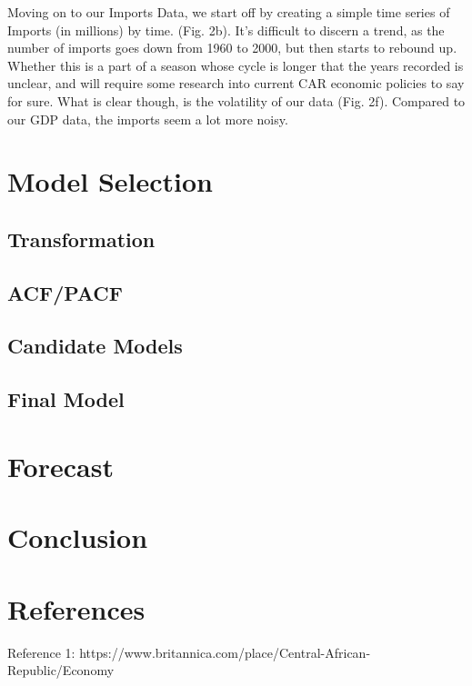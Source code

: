 \documentclass[11pt]{article}
\begin{document}
Moving on to our Imports Data, we start off by creating a simple time series of Imports (in millions) by time. (Fig. 2b). It's difficult to discern a trend, as the number of imports goes down from 1960 to 2000, but then starts to rebound up. Whether this is a part of a season whose cycle is longer that the years recorded is unclear, and will require some research into current CAR economic policies to say for sure. What is clear though, is the volatility of our data (Fig. 2f). Compared to our GDP data, the imports seem a lot more noisy.


\section{Model Selection}
\subsection{Transformation}
\subsection{ACF/PACF}
\subsection{Candidate Models}
\subsection{Final Model}

\section{Forecast}

\section{Conclusion}

\newpage

\section{References}

Reference 1: https://www.britannica.com/place/Central-African-Republic/Economy
\end{document}
